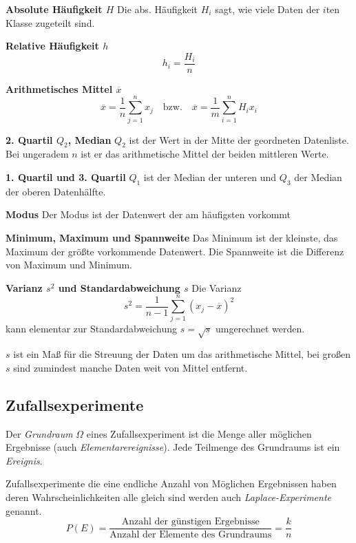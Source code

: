 \documentclass[twocolumn]{article}
\newcommand{\term}[1]{\emph{#1}}
\newcommand{\separator}{\vspace{0.5em}}
\newcommand{\topic}[1]{\noindent\textbf{#1}}
\newcommand{\avg}[1]{\overline{#1}}
\begin{document}
\separator
\topic{Absolute Häufigkeit $H$} Die abs. Häufigkeit $H_i$ sagt, wie viele Daten der $i$ten Klasse zugeteilt sind.
\separator

\topic{Relative Häufigkeit $h$}
\begin{equation*}
    h_i = \frac{H_i}{n}
\end{equation*}

\topic{Arithmetisches Mittel $\avg{x}$}
\begin{equation*}
    \avg{x} = \frac{1}{n} \sum^{n}_{j = 1}x_j\quad \mathrm{bzw.}\quad \avg{x} = \frac{1}{m} \sum^{n}_{i = 1}H_{i}x_{i}
\end{equation*}

\topic{2. Quartil $Q_2$, Median} $Q_2$ ist der Wert in der Mitte der geordneten Datenliste. Bei ungeradem $n$ ist er das arithmetische Mittel der beiden mittleren Werte.
\separator

\topic{1. Quartil und 3. Quartil} $Q_1$ ist der Median der unteren und $Q_3$ der Median der oberen Datenhälfte.
\separator

\topic{Modus} Der Modus ist der Datenwert der am häufigsten vorkommt
\separator

\topic{Minimum, Maximum und Spannweite} Das Minimum ist der kleinste, das Maximum der größte vorkommende Datenwert. Die Spannweite ist die Differenz von Maximum und Minimum.
\separator

\topic{Varianz $s^2$ und Standardabweichung $s$} Die Varianz
\begin{equation*}
    s^2 = \frac{1}{n - 1} \sum^{n}_{j = 1}(x_j - \avg{x})^2
\end{equation*}
kann elementar zur Standardabweichung $s = \sqrt{s}$ umgerechnet werden.

$s$ ist ein Maß für die Streuung der Daten um das arithmetische Mittel, bei großen $s$ sind zumindest manche Daten weit von Mittel entfernt.

\subsection{Zufallsexperimente}

Der \term{Grundraum} $\Omega$ eines Zufallsexperiment ist die Menge aller möglichen Ergebnisse (auch \term{Elementarereignisse}). Jede Teilmenge des Grundraums ist ein \term{Ereignis}.
\separator

Zufallsexperimente die eine endliche Anzahl von Möglichen Ergebnissen haben deren Wahrscheinlichkeiten alle gleich sind werden auch \term{Laplace-Experimente} genannt.
\begin{equation*}
    P(E) = \frac{\text{Anzahl der günstigen Ergebnisse}}{\text{Anzahl der Elemente des Grundraums}} = \frac{k}{n}
\end{equation*}
\end{document}
